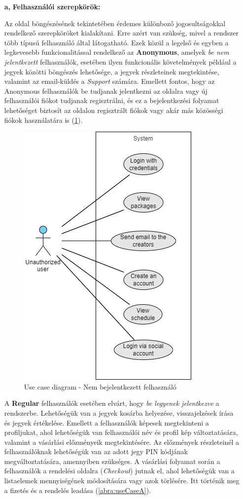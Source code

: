 \begin{itemize}
  	\item[\textbf{a,}] \textbf{Felhasználói szerepkörök:}

Az oldal böngészésének tekintetében érdemes különboző jogosultságokkal rendelkező szerepköröket kialakítani. Erre azért van szükség, mivel a rendszer több típusú felhasználó által látogatható. Ezek közül a legelső és egyben a legkevesebb funkcionalitással rendelkező az \textbf{Anonymous}, amelyek \textit{be nem jelentkezett} felhasználók, esetében ilyen funkcionális követelmények például a jegyek közötti böngészés lehetősége, a jegyek részleteinek megtekintése, valamint az email-küldés a \textit{Support} számára. Emellett fontos, hogy az Anonymous felhasználók be tudjanak jelentkezni az oldalra vagy új felhasználói fiókot tudjanak regisztrálni, és ez a bejelentkezési folyamat lehetőséget biztosít az oldalon regisztrált fiókok vagy akár más közösségi fiókok használatára is (\ref{abra:useCaseNA}).

\begin{figure}[!h]
	\centering
	\includegraphics[scale=0.7]{images/useCaseNA}
	\caption{Use case diagram - Nem bejelentkezett felhasználó}
	\label{abra:useCaseNA}
\end{figure}
\pagebreak

A \textbf{Regular} felhasználók esetében elvárt, hogy \textit{be legyenek jelentkezve} a rendszerbe. Lehetőségük van a jegyek kosárba helyezése, visszajelzések írása és jegyek értékelése. Emellett a felhasználók képesek megtekinteni a profiljukat, ahol lehetőségük van felhasználói név és profil kép változtatására, valamint a vásárlási előzményeik megtekintésére. Az előzmények részleteinél a felhasználóknak lehetőségük van az adott jegy PIN kódjának megváltoztatására, amennyiben szükséges. A vásárlási folyamat során a felhasználók a rendelési oldalra (\textit{Checkout}) jutnak el, ahol lehetőségük van a listaelemek mennyiségének módosítására vagy azok törlésére. Itt történik meg a fizetés és a rendelés leadása (\ref{abra:useCaseA}).


\end{itemize}
